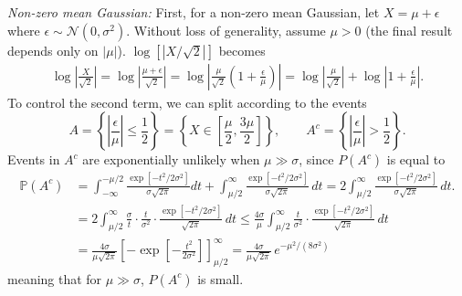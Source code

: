 \documentclass[12pt,onecolumn, margin=1in]{IEEEtran}
\newcommand{\bracket}[1]{\left[ #1 \right]}
\newcommand{\abs}[1]{\left| #1 \right|}
\begin{document}
\textit{Non-zero mean Gaussian: }First, for a non-zero mean Gaussian, let $X = \mu + \epsilon$ where $\epsilon \sim \mathcal{N}(0, \sigma^2)$. Without loss of generality, assume $\mu > 0$ (the final result depends only on $|\mu|$). $\log\bracket{\abs{X/\sqrt{2}}}$ becomes\begin{align}
    \log\left|\frac{X}{\sqrt{2}}\right| = \log\left|\frac{\mu + \epsilon}{\sqrt{2}}\right| 
    = \log\left|\frac{\mu}{\sqrt{2}}\left(1 + \frac{\epsilon}{\mu}\right)\right| 
    = \log\left|\frac{\mu}{\sqrt{2}}\right| + \log\left|1 + \frac{\epsilon}{\mu}\right|.\label{eq:split_x}
\end{align}
To control the second term, we can split according to the events
\begin{equation}
    A=\left\{\abs{\frac{\epsilon}{\mu}} \leq \frac{1}{2}\right\} = \left\{X \in \bracket{\frac{\mu}{2}, \frac{3\mu}{2}}\right\}, \qquad A^c= \left\{|\frac{\epsilon}{\mu}| > \frac{1}{2}\right\}.
\end{equation}
Events in $A^c$ are exponentially unlikely when $\mu\gg\sigma$, since $P(A^c)$ is equal to
\begin{align}
    \mathbb P(A^c)& =\int_{-\infty}^{-\mu/2} \frac{\exp[-t^2/2\sigma^2]}{\sigma \sqrt{2\pi}} dt + \int_{\mu/2}^{\infty} \frac{\exp[-t^2/2\sigma^2]}{\sigma\sqrt{2\pi}}\,dt  = 2 \int_{\mu/2}^{\infty} \frac{\exp[-t^2/2\sigma^2]}{\sigma\sqrt{2\pi}}\,dt. \\
    &= 2\int_{\mu/2}^{\infty} \frac{\sigma}{t} \cdot
       \frac{t}{\sigma^2} \cdot
       \frac{\exp[-t^2/2\sigma^2]}{\sqrt{2\pi}}\,dt \leq \frac{4\sigma}{\mu} \int_{\mu/2}^{\infty}
       \frac{t}{\sigma^2} \cdot
       \frac{\exp[-t^2/2\sigma^2]}{\sqrt{2\pi}}\,dt \\
    & = \frac{4\sigma}{\mu\sqrt{2\pi}}\left[-\exp\left[-\frac{t^2}{2\sigma^2}
       \right]\right]_{\mu/2}^{\infty} = \frac{4\sigma}{\mu\sqrt{2\pi}}\,e^{-\mu^2/(8\sigma^2)}\label{eq:p_ac_bound}
\end{align}
meaning that for $\mu \gg \sigma$, $P(A^c)$ is small.
\end{document}
